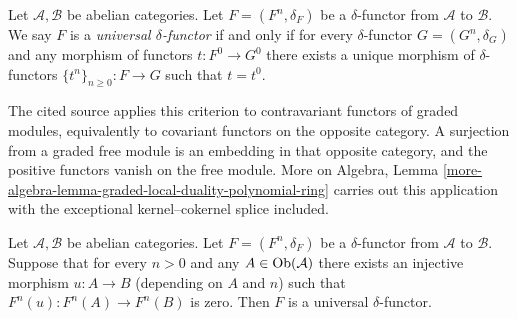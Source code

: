 \begin{definition}
\label{definition-universal-delta-functor}
Let $\mathcal{A}, \mathcal{B}$ be abelian categories.
Let $F = (F^n, \delta_F)$ be a $\delta$-functor
from $\mathcal{A}$ to $\mathcal{B}$.
We say $F$ is a {\it universal $\delta$-functor} if and only
if for every $\delta$-functor $G = (G^n, \delta_G)$ and any
morphism of functors $t : F^0 \to G^0$ there exists
a unique morphism of $\delta$-functors $\{t^n\}_{n \geq 0} : F \to G$
such that $t = t^0$.
\end{definition}

\begin{lemma}
\label{lemma-efface-implies-universal}
\begin{reference}
\cite[Chapter III, \S 4, no. 72, properties (ii)--(iv) and the
derived-functor argument, pp. 265--267]{FAC}
\end{reference}
\begin{history}
The cited source applies this criterion to contravariant functors of graded
modules, equivalently to covariant functors on the opposite category. A
surjection from a graded free module is an embedding in that opposite
category, and the positive functors vanish on the free module. More on
Algebra, Lemma
\ref{more-algebra-lemma-graded-local-duality-polynomial-ring} carries out
this application with the exceptional kernel--cokernel splice included.
\end{history}
Let $\mathcal{A}, \mathcal{B}$ be abelian categories.
Let $F = (F^n, \delta_F)$ be a $\delta$-functor
from $\mathcal{A}$ to $\mathcal{B}$.
Suppose that for every $n > 0$ and any $A \in \mathop{\mathrm{Ob}}\nolimits(\mathcal{A})$
there exists an injective morphism $u : A \to B$ (depending on $A$ and $n$)
such that $F^n(u) : F^n(A) \to F^n(B)$ is zero. Then $F$ is a universal
$\delta$-functor.
\end{lemma}

